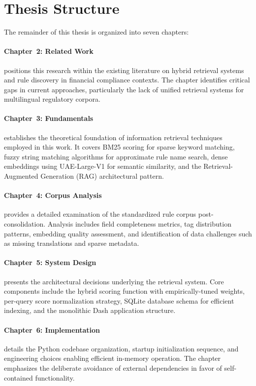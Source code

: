 \section{Thesis Structure}

The remainder of this thesis is organized into seven chapters:

\paragraph{Chapter~2: Related Work} positions this research within the existing literature on hybrid retrieval systems and rule discovery in financial compliance contexts. The chapter identifies critical gaps in current approaches, particularly the lack of unified retrieval systems for multilingual regulatory corpora.

\paragraph{Chapter~3: Fundamentals} establishes the theoretical foundation of information retrieval techniques employed in this work. It covers BM25 scoring for sparse keyword matching, fuzzy string matching algorithms for approximate rule name search, dense embeddings using UAE-Large-V1 for semantic similarity, and the Retrieval-Augmented Generation (RAG) architectural pattern.

\paragraph{Chapter~4: Corpus Analysis} provides a detailed examination of the standardized rule corpus post-consolidation. Analysis includes field completeness metrics, tag distribution patterns, embedding quality assessment, and identification of data challenges such as missing translations and sparse metadata.

\paragraph{Chapter~5: System Design} presents the architectural decisions underlying the retrieval system. Core components include the hybrid scoring function with empirically-tuned weights, per-query score normalization strategy, SQLite database schema for efficient indexing, and the monolithic Dash application structure.

\paragraph{Chapter~6: Implementation} details the Python codebase organization, startup initialization sequence, and engineering choices enabling efficient in-memory operation. The chapter emphasizes the deliberate avoidance of external dependencies in favor of self-contained functionality.

